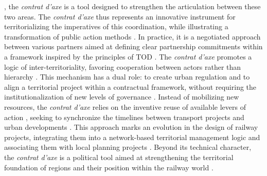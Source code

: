 \begin{refsegment}
{}, the \textsl{contrat d’axe} is a tool designed to strengthen the articulation between these two areas. The \textsl{contrat d’axe} thus represents an innovative instrument for territorializing the imperatives of this coordination, while illustrating a transformation of public action methods \textcolor{blue}{\autocite[427]{maulat_coordonner_2014}}. In practice, it is a negotiated approach between various partners aimed at defining clear partnership commitments within a framework inspired by the principles of \acrshort{TOD} \textcolor{blue}{\autocite[1]{cerema_outils_2021}}. The \textsl{contrat d’axe} promotes a logic of inter-territoriality, favoring cooperation between actors rather than hierarchy \textcolor{blue}{\autocite[112, 133]{vanier_pouvoir_2008}}. This mechanism has a dual role: to create urban regulation and to align a territorial project within a contractual framework, without requiring the institutionalization of new levels of governance \textcolor{blue}{\autocite[11]{cerema_articuler_2010}}. Instead of mobilizing new resources, the \textsl{contrat d’axe} relies on the inventive reuse of available levers of action \textcolor{blue}{\autocite[12]{cerema_articuler_2010}}, seeking to synchronize the timelines between transport projects and urban developments \textcolor{blue}{\autocite[25]{meunier-chabert_contrats_2014}}. This approach marks an evolution in the design of railway projects, integrating them into a network-based territorial management logic and associating them with local planning projects \textcolor{blue}{\autocites[457, 468]{maulat_coordonner_2014}[94]{maulat_contractualiser_2015}}. Beyond its technical character, the \textsl{contrat d’axe} is a political tool aimed at strengthening the territorial foundation of regions and their position within the railway world \textcolor{blue}{\autocite[93]{maulat_contractualiser_2015}}.%


\end{refsegment}
